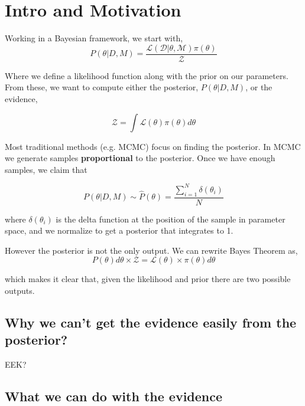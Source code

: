 \documentclass[useAMS,usenatbib,onecolumn]{mnras}
\begin{document}
\noindent{}

\section{Intro and Motivation}

Working in a Bayesian framework, we start with,
\begin{equation}
    P(\theta | D, M) = \frac{\mathcal{L(D | \theta, M)} \pi(\theta)}{\mathcal{Z}}
\end{equation}

Where we define a likelihood function along with the prior on our parameters. From these, we want to compute either the posterior, $P(\theta | D, M)$, or the evidence,

\begin{equation}
    \mathcal{Z} = \int \mathcal{L}(\theta) \pi(\theta) d\theta
\end{equation}

Most traditional methods (e.g. MCMC) focus on finding the posterior. In MCMC we generate samples {\bf proportional} to the posterior. Once we have enough samples, we claim that

\begin{equation}
    P(\theta | D, M) \sim \hat{P}(\theta) = \frac{\sum_{i=1}^{N} \delta(\theta_i)}{N}
\end{equation}

\noindent where $\delta(\theta_i)$ is the delta function at the position of the sample in parameter space, and we normalize to get a posterior that integrates to 1.


However the posterior is not the only output. We can rewrite Bayes Theorem as,
\begin{equation}
    P(\theta)d\theta \times \mathcal{Z} = \mathcal{L(\theta)} \times \pi(\theta) d\theta
\end{equation}

\noindent which makes it clear that, given the likelihood and prior there are two possible outputs.

\subsection{Why we can't get the evidence easily from the posterior?}

EEK?


\subsection{What we can do with the evidence}
\end{document}
